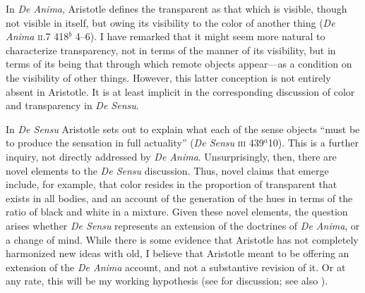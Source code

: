 In \emph{De Anima}, Aristotle defines the transparent as that which is visible, though not visible in itself, but owing its visibility to the color of another thing (\emph{De Anima} \textsc{ii}.7 418\( ^{b} \) 4--6). I have remarked that it might seem more natural to characterize transparency, not in terms of the manner of its visibility, but in terms of its being that through which remote objects appear---as a condition on the visibility of other things. However, this latter conception is not entirely absent in Aristotle. It is at least implicit in the corresponding discussion of color and transparency in \emph{De Sensu}.

In \emph{De Sensu} Aristotle sets out to explain what each of the sense objects ``must be to produce the sensation in full actuality'' (\emph{De Sensu} \textsc{iii} 439\( ^{a} \)10). This is a further inquiry, not directly addressed by \emph{De Anima}. Unsurprisingly, then, there are novel elements to the \emph{De Sensu} discussion. Thus, novel claims that emerge include, for example, that color resides in the proportion of transparent that exists in all bodies, and an account of the generation of the hues in terms of the ratio of black and white in a mixture. Given these novel elements, the question arises whether \emph{De Sensu} represents an extension of the doctrines of \emph{De Anima}, or a change of mind. While there is some evidence that Aristotle has not completely harmonized new ideas with old, I believe that Aristotle meant to be offering an extension of the \emph{De Anima} account, and not a substantive revision of it. Or at any rate, this will be my working hypothesis (see \citealt{Kahn:1966zr} for discussion; see also \citealt[291]{Caston:2005cr} \citealt[37]{Nussbaum:1995ly}).

